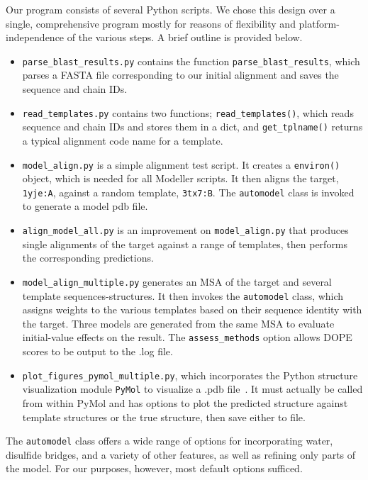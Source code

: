 \documentclass[notitlepage]{report}   %
\begin{document}
Our program consists of several Python scripts. We chose this design over a single, comprehensive program mostly for reasons of flexibility and platform-independence of the various steps. A brief outline is provided below.
\begin{itemize}
\item \texttt{parse\_blast\_results.py} contains the function \texttt{parse\_blast\_results}, which parses a FASTA file corresponding to our initial alignment and saves the sequence and chain IDs.
\item \texttt{read\_templates.py} contains two functions; \texttt{read\_templates()}, which reads sequence and chain IDs and stores them in a dict, and \texttt{get\_tplname()} returns a typical alignment code name for a template.
\item \texttt{model\_align.py} is a simple alignment test script. It creates a \texttt{environ()} object, which is needed for all Modeller scripts. It then aligns the target, \texttt{1yje:A}, against a random template, \texttt{3tx7:B}. The \texttt{automodel} class is invoked to generate a model pdb file.
\item \texttt{align\_model\_all.py} is an improvement on \texttt{model\_align.py} that produces single alignments of the target against a range of templates, then performs the corresponding predictions.
\item \texttt{model\_align\_multiple.py} generates an MSA of the target and several template sequences-structures. It then invokes the \texttt{automodel} class, which assigns weights to the various templates based on their sequence identity with the target. Three models are generated from the same MSA to evaluate initial-value effects on the result. The \texttt{assess\_methods} option allows DOPE scores to be output to the .log file.
\item \texttt{plot\_figures\_pymol\_multiple.py}, which incorporates the Python structure visualization module \texttt{PyMol} to visualize a .pdb file~\cite{pymol}. It must actually be called from within PyMol and has options to plot the predicted structure against template structures or the true structure, then save either to file.
\end{itemize}

The \texttt{automodel} class offers a wide range of options for incorporating water, disulfide bridges, and a variety of other features, as well as refining only parts of the model. For our purposes, however, most default options sufficed.
\end{document}
